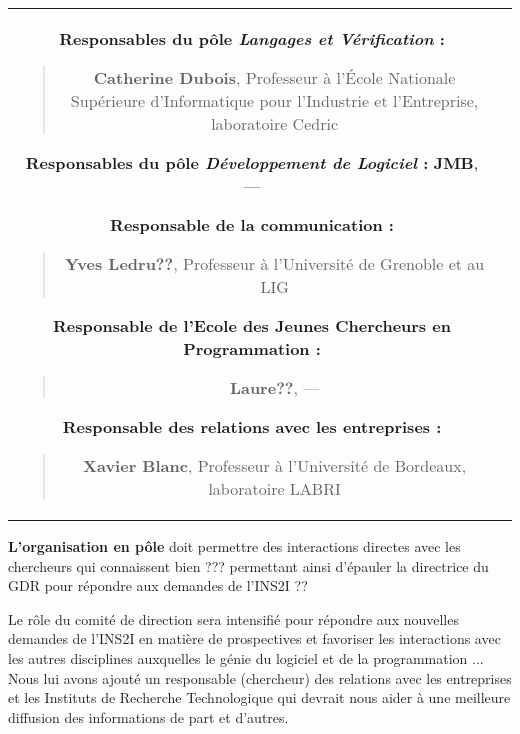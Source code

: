 \documentclass[11pt]{article}
\begin{document}
\begin{small}
\begin{center}
\begin{tabular}{c|c}
\begin{minipage}[t]{.5\textwidth}
  \textbf{Responsables du pôle \textit{Langages et Vérification} :}
  \begin{quote}

     \textbf{Catherine Dubois}, Professeur à l'École Nationale Supérieure d'Informatique pour l'Industrie et l'Entreprise, laboratoire Cedric
  \end{quote}

  \textbf{Responsables du pôle \textit{Développement de Logiciel} :}
      \textbf{JMB}, ---
  \begin{quote}

\end{quote}

\textbf{Responsable de la communication :}
\begin{quote}
  \textbf{Yves Ledru??}, Professeur à l'Université de Grenoble et au LIG
\end{quote}

\textbf{Responsable de l'Ecole des Jeunes Chercheurs en Programmation :}
\begin{quote}
  \textbf{Laure??}, --- 
  \end{quote}
  \textbf{Responsable des relations avec les entreprises :}
\begin{quote}
      \textbf{Xavier Blanc}, Professeur à l'Université de Bordeaux, laboratoire LABRI
\end{quote}
\end{minipage}

\end{tabular}
\end{center}

\end{small}
\medskip

\noindent


\textbf{L'organisation en pôle} doit permettre des interactions directes avec les chercheurs qui connaissent bien ??? permettant ainsi d'épauler la directrice du GDR pour répondre aux demandes de l'INS2I ??

Le rôle du comité de direction sera intensifié pour répondre aux nouvelles demandes de l'INS2I en matière de prospectives et favoriser les interactions avec les autres disciplines auxquelles le génie du logiciel et de la programmation ...
Nous lui avons ajouté un responsable (chercheur) des relations avec les entreprises et les Instituts de Recherche Technologique  qui devrait nous aider à une meilleure diffusion des informations de part et d'autres.
\end{document}
